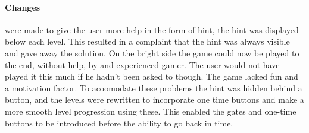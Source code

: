 \paragraph{Changes} were made to give the user more help in the form of hint, the hint was displayed below each level. This resulted in a complaint that the hint was always visible and gave away the solution. On the bright side the game could now be played to the end, without help, by and experienced gamer. The user would not have played it this much if he hadn't been asked to though. The game lacked fun and a motivation factor.
To acoomodate these problems the hint was hidden behind a button, and the levels were rewritten to incorporate one time buttons and make a more smooth level progression using these. This enabled the gates and one-time buttons to be introduced before the ability to go back in time.